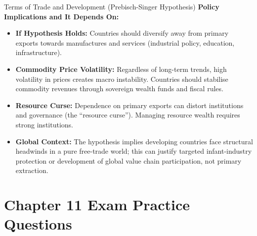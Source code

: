 \documentclass[11pt, a4paper, twoside]{book}
\begin{document}
\begin{evaluation}{Terms of Trade and Development (Prebisch-Singer Hypothesis)}
\textbf{Policy Implications and It Depends On:}
\begin{itemize}
  \item \textbf{If Hypothesis Holds:} Countries should diversify away from primary exports towards manufactures and services (industrial policy, education, infrastructure).
  \item \textbf{Commodity Price Volatility:} Regardless of long-term trends, high volatility in prices creates macro instability. Countries should stabilise commodity revenues through sovereign wealth funds and fiscal rules.
  \item \textbf{Resource Curse:} Dependence on primary exports can distort institutions and governance (the ``resource curse''). Managing resource wealth requires strong institutions.
  \item \textbf{Global Context:} The hypothesis implies developing countries face structural headwinds in a pure free-trade world; this can justify targeted infant-industry protection or development of global value chain participation, not primary extraction.
\end{itemize}
\end{evaluation}

\section*{Chapter 11 Exam Practice Questions}
\end{document}
